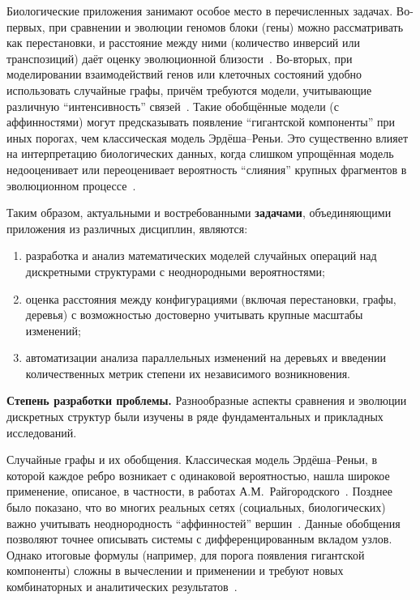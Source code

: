 Биологические приложения занимают особое место в перечисленных задачах.  
Во-первых, при сравнении и эволюции геномов блоки (гены) можно рассматривать как перестановки, и расстояние между ними (количество инверсий или транспозиций) даёт оценку эволюционной близости~\cite{yancopoulos2005,braga2010}.  
Во-вторых, при моделировании взаимодействий генов или клеточных состояний удобно использовать случайные графы, причём требуются модели, учитывающие различную ``интенсивность'' связей~\cite{Barabsi2004}. 
Такие обобщённые модели (с аффинностями) могут предсказывать появление ``гигантской компоненты'' при иных порогах, чем классическая модель Эрдёша--Реньи. 
Это существенно влияет на интерпретацию биологических данных, когда слишком упрощённая модель недооценивает или переоценивает вероятность ``слияния'' крупных фрагментов в эволюционном процессе~\cite{tannier2016}.  

Таким образом, актуальными и востребованными \textbf{задачами}, объединяющими приложения из различных дисциплин, являются:  
\begin{enumerate}
    \item разработка и анализ математических моделей случайных операций над дискретными структурами с неоднородными вероятностями;  
    \item оценка расстояния между конфигурациями (включая перестановки, графы, деревья) с возможностью достоверно учитывать крупные масштабы изменений;  
    \item автоматизации анализа параллельных изменений на деревьях и введении количественных метрик степени их независимого возникновения. 
\end{enumerate}

\textbf{Степень разработки проблемы.}  
Разнообразные аспекты сравнения и эволюции дискретных структур были изучены в ряде фундаментальных и прикладных исследований.  

Случайные графы и их обобщения. 
Классическая модель Эрдёша--Реньи, в которой каждое ребро возникает с одинаковой вероятностью, нашла широкое применение, описаное, в частности, в работах А.М.~Райгородского~\cite{райгородский2010модели,райгородский2022модели}.  
Позднее было показано, что во многих реальных сетях (социальных, биологических) важно учитывать неоднородность ``аффинностей'' вершин~\cite{tannier2016}.
Данные обобщения позволяют точнее описывать системы с дифференцированным вкладом узлов.
Однако итоговые формулы (например, для порога появления гигантской компоненты) сложны в вычеслении и применении и требуют новых комбинаторных и аналитических результатов~\cite{tannier2016}.  

